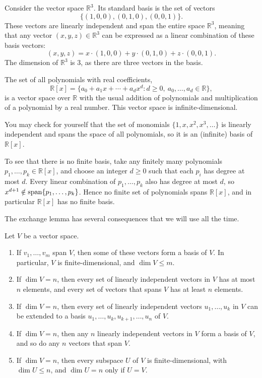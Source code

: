 \begin{example}
    Consider the vector space $\mathbb{R}^3$. Its standard basis is the set of vectors
    \[\{(1, 0, 0), (0, 1, 0), (0, 0, 1)\}.\]
    These vectors are linearly independent and span the entire space $\mathbb{R}^3$, meaning that any vector $(x, y, z) \in \mathbb{R}^3$ can be expressed as a linear combination of these basis vectors:
    \[(x, y, z) = x \cdot (1, 0, 0) + y \cdot (0, 1, 0) + z \cdot (0, 0, 1).\]
    The dimension of $\mathbb{R}^3$ is $3$, as there are three vectors in the basis.
\end{example}

\begin{example}
    The set of all polynomials with real coefficients,
    \[\mathbb{R}[x] = \{a_0 + a_1 x + \cdots + a_d x^d : d \geq 0, \ a_0, \ldots, a_d \in \mathbb{R}\},\]
    is a vector space over $\mathbb{R}$ with the usual addition of polynomials and multiplication of a polynomial by a real number. This vector space is infinite-dimensional.

    You may check for yourself that the set of monomials $\{1, x, x^2, x^3, \ldots\}$ is linearly independent and spans the space of all polynomials, so it is an (infinite) basis of $\mathbb{R}[x]$.

    To see that there is no finite basis, take any finitely many polynomials $p_1, \ldots, p_k \in \mathbb{R}[x]$, and choose an integer $d \geq 0$ such that each $p_i$ has degree at most $d$. Every linear combination of $p_1, \ldots, p_k$ also has degree at most $d$, so $x^{d+1} \notin \operatorname{span}\{p_1, \ldots, p_k\}$. Hence no finite set of polynomials spans $\mathbb{R}[x]$, and in particular $\mathbb{R}[x]$ has no finite basis.
\end{example}

The exchange lemma has several consequences that we will use all the time.

\begin{corollary}\label{L1-cor:dim-facts}
    Let $V$ be a vector space.
    \begin{enumerate}
        \item If $v_1, \ldots, v_m$ span $V$, then some of these vectors form a basis of $V$. In particular, $V$ is finite-dimensional, and $\dim V \leq m$.
        \item If $\dim V = n$, then every set of linearly independent vectors in $V$ has at most $n$ elements, and every set of vectors that spans $V$ has at least $n$ elements.
        \item If $\dim V = n$, then every set of linearly independent vectors $u_1, \ldots, u_k$ in $V$ can be extended to a basis $u_1, \ldots, u_k, u_{k+1}, \ldots, u_n$ of $V$.
        \item If $\dim V = n$, then any $n$ linearly independent vectors in $V$ form a basis of $V$, and so do any $n$ vectors that span $V$.
        \item If $\dim V = n$, then every subspace $U$ of $V$ is finite-dimensional, with $\dim U \leq n$, and $\dim U = n$ only if $U = V$.
    \end{enumerate}
\end{corollary}

